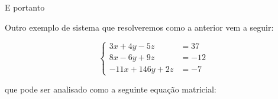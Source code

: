 \documentclass[twocolumn,oneside,a4paper,12pt]{article}
\begin{document}
\noindent E portanto


Outro exemplo de sistema que resolveremos como a anterior vem a seguir:

\begin{equation*}
  \left\{ \begin{aligned}
      3x + 4y - 5z & = 37 \\
      8x - 6y + 9z & = -12 \\
      -11x + 146y + 2z & = -7
  \end{aligned} \right.
\end{equation*}

\noindent que pode ser analisado como a seguinte equação matricial:

\end{document}
